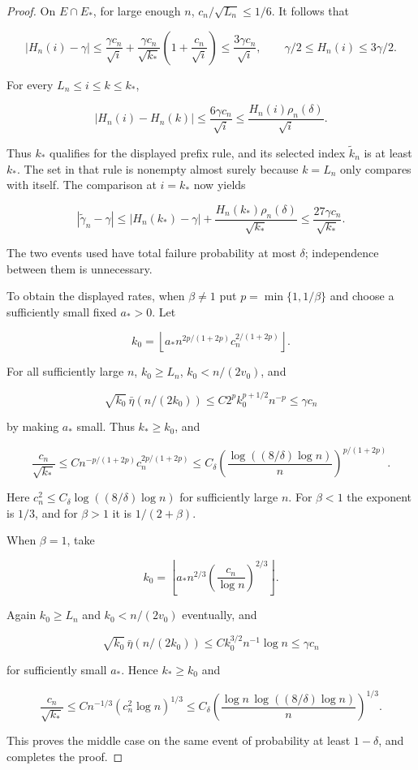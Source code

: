 \documentclass[12pt]{article}
\theoremstyle{plain}
\theoremstyle{definition}
\begin{document}
\begin{proof}
On $E\cap E_*$, for large enough $n$, $c_n/\sqrt{L_n}\leq1/6$. It follows that

\[
|H_n(i)-\gamma|\leq\frac{\gamma c_n}{\sqrt i}+\frac{\gamma c_n}{\sqrt{k_*}}\left(1+\frac{c_n}{\sqrt i}\right)
\leq\frac{3\gamma c_n}{\sqrt i},\qquad
\gamma/2\leq H_n(i)\leq3\gamma/2.
\]

For every $L_n\leq i\leq k\leq k_*$,

\[
|H_n(i)-H_n(k)|\leq\frac{6\gamma c_n}{\sqrt i}
\leq\frac{H_n(i)\rho_n(\delta)}{\sqrt i}.
\]

Thus $k_*$ qualifies for the displayed prefix rule, and its selected index $\widetilde k_n$ is at least $k_*$. The set in that rule is nonempty almost surely because $k=L_n$ only compares with itself. The comparison at $i=k_*$ now yields

\[
|\widetilde\gamma_n-\gamma|\leq|H_n(k_*)-\gamma|+\frac{H_n(k_*)\rho_n(\delta)}{\sqrt{k_*}}
\leq\frac{27\gamma c_n}{\sqrt{k_*}}.
\]

The two events used have total failure probability at most $\delta$; independence between them is unnecessary. 

To obtain the displayed rates, when $\beta\ne1$ put $p=\min\{1,1/\beta\}$ and choose a sufficiently small fixed $a_*>0$. Let

\[
k_0=\left\lfloor a_* n^{2p/(1+2p)}c_n^{2/(1+2p)}\right\rfloor.
\]

For all sufficiently large $n$, $k_0\geq L_n$, $k_0<n/(2v_0)$, and

\[
\sqrt{k_0}\,\bar\eta(n/(2k_0))\leq C2^p k_0^{p+1/2}n^{-p}\leq\gamma c_n
\]

by making $a_*$ small. Thus $k_*\geq k_0$, and

\[
\frac{c_n}{\sqrt{k_*}}\leq C n^{-p/(1+2p)}c_n^{2p/(1+2p)}
\leq C_\delta\left(\frac{\log((8/\delta)\log n)}n\right)^{p/(1+2p)}.
\]

Here $c_n^2\leq C_\delta\log((8/\delta)\log n)$ for sufficiently large $n$. For $\beta<1$ the exponent is $1/3$, and for $\beta>1$ it is $1/(2+\beta)$. 

When $\beta=1$, take

\[
k_0=\left\lfloor a_*n^{2/3}\left(\frac{c_n}{\log n}\right)^{2/3}\right\rfloor.
\]

Again $k_0\geq L_n$ and $k_0<n/(2v_0)$ eventually, and

\[
\sqrt{k_0}\,\bar\eta(n/(2k_0))\leq Ck_0^{3/2}n^{-1}\log n\leq\gamma c_n
\]

for sufficiently small $a_*$. Hence $k_*\geq k_0$ and

\[
\frac{c_n}{\sqrt{k_*}}\leq C n^{-1/3}(c_n^2\log n)^{1/3}
\leq C_\delta\left(\frac{\log n\,\log((8/\delta)\log n)}n\right)^{1/3}.
\]

This proves the middle case on the same event of probability at least $1-\delta$, and completes the proof.
\end{proof}
\end{document}
